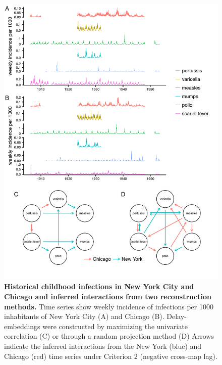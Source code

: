 \begin{figure}
\begin{center}
  \includegraphics[width=6in]{dataflow/out/fig_cities/fig_cities.pdf}
  \end{center}
    \caption{\textbf{Historical childhood infections in New York City and Chicago and inferred interactions from two reconstruction methods.} Time series show weekly incidence of infections per 1000 inhabitants of New York City (A) and Chicago (B). Delay-embeddings were constructed by maximizing the univariate correlation (C) or through a random projection method (D) Arrows indicate the inferred interactions from the New York (blue) and Chicago (red) time series under Criterion 2 (negative cross-map lag).\label{fig:historical_data_tmp}} 
\end{figure}

